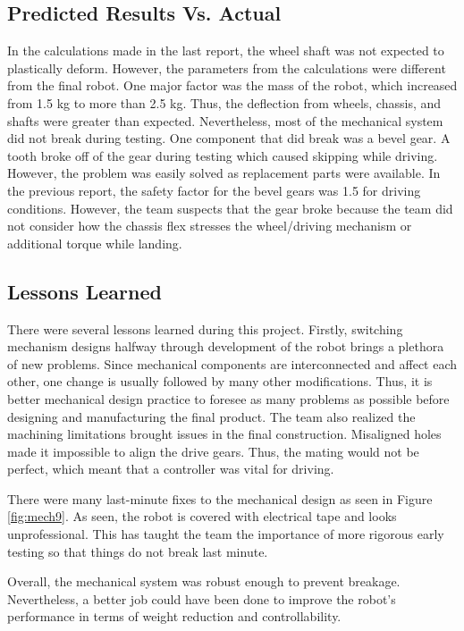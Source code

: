 \documentclass[ece]{uw-wkrpt}
\begin{document}
\subsection{Predicted Results Vs. Actual}

In the calculations made in the last report, the wheel shaft was not expected to plastically deform. However, the parameters from the calculations were different from the final robot. One major factor was the mass of the robot, which increased from 1.5 kg to more than 2.5 kg. Thus, the deflection from wheels, chassis, and shafts were greater than expected. Nevertheless, most of the mechanical system did not break during testing. One component that did break was a bevel gear. A tooth broke off of the gear during testing which caused skipping while driving. However, the problem was easily solved as replacement parts were available. In the previous report, the safety factor for the bevel gears was 1.5 for driving conditions. However, the team suspects that the gear broke because the team did not consider how the chassis flex stresses the wheel/driving mechanism or additional torque while landing.

\subsection{Lessons Learned}

There were several lessons learned during this project. Firstly, switching mechanism designs halfway through development of the robot brings a plethora of new problems. Since mechanical components are interconnected and affect each other, one change is usually followed by many other modifications. Thus, it is better mechanical design practice to foresee as many problems as possible before designing and manufacturing the final product. The team also realized the machining limitations brought issues in the final construction. Misaligned holes made it impossible to align the drive gears. Thus, the mating would not be perfect, which meant that a controller was vital for driving. 

There were many last-minute fixes to the mechanical design as seen in Figure \ref{fig:mech9}. As seen, the robot is covered with electrical tape and looks unprofessional. This has taught the team the importance of more rigorous early testing so that things do not break last minute. 

Overall, the mechanical system was robust enough to prevent breakage. Nevertheless, a better job could have been done to improve the robot’s performance in terms of weight reduction and controllability. 
\end{document}

